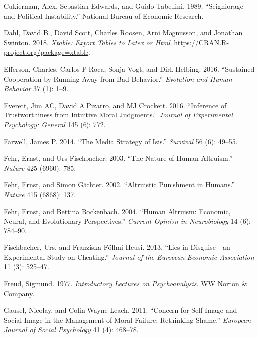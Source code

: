 \documentclass[man]{apa6}
\begin{document}
\leavevmode\hypertarget{ref-cukierman1989seigniorage}{}%
Cukierman, Alex, Sebastian Edwards, and Guido Tabellini. 1989.
``Seigniorage and Political Instability.'' National Bureau of Economic
Research.

\leavevmode\hypertarget{ref-R-xtable}{}%
Dahl, David B., David Scott, Charles Roosen, Arni Magnusson, and
Jonathan Swinton. 2018. \emph{Xtable: Export Tables to Latex or Html}.
\url{https://CRAN.R-project.org/package=xtable}.

\leavevmode\hypertarget{ref-efferson2016sustained}{}%
Efferson, Charles, Carlos P Roca, Sonja Vogt, and Dirk Helbing. 2016.
``Sustained Cooperation by Running Away from Bad Behavior.''
\emph{Evolution and Human Behavior} 37 (1): 1--9.

\leavevmode\hypertarget{ref-everett2016inference}{}%
Everett, Jim AC, David A Pizarro, and MJ Crockett. 2016. ``Inference of
Trustworthiness from Intuitive Moral Judgments.'' \emph{Journal of
Experimental Psychology: General} 145 (6): 772.

\leavevmode\hypertarget{ref-farwell2014media}{}%
Farwell, James P. 2014. ``The Media Strategy of Isis.'' \emph{Survival}
56 (6): 49--55.

\leavevmode\hypertarget{ref-fehr2003nature}{}%
Fehr, Ernst, and Urs Fischbacher. 2003. ``The Nature of Human
Altruism.'' \emph{Nature} 425 (6960): 785.

\leavevmode\hypertarget{ref-fehr2002altruistic}{}%
Fehr, Ernst, and Simon Gächter. 2002. ``Altruistic Punishment in
Humans.'' \emph{Nature} 415 (6868): 137.

\leavevmode\hypertarget{ref-fehr2004human}{}%
Fehr, Ernst, and Bettina Rockenbach. 2004. ``Human Altruism: Economic,
Neural, and Evolutionary Perspectives.'' \emph{Current Opinion in
Neurobiology} 14 (6): 784--90.

\leavevmode\hypertarget{ref-fischbacher2013lies}{}%
Fischbacher, Urs, and Franziska Föllmi-Heusi. 2013. ``Lies in
Disguise---an Experimental Study on Cheating.'' \emph{Journal of the
European Economic Association} 11 (3): 525--47.

\leavevmode\hypertarget{ref-freud1977introductory}{}%
Freud, Sigmund. 1977. \emph{Introductory Lectures on Psychoanalysis}. WW
Norton \& Company.

\leavevmode\hypertarget{ref-gausel2011concern}{}%
Gausel, Nicolay, and Colin Wayne Leach. 2011. ``Concern for Self-Image
and Social Image in the Management of Moral Failure: Rethinking Shame.''
\emph{European Journal of Social Psychology} 41 (4): 468--78.
\end{document}
